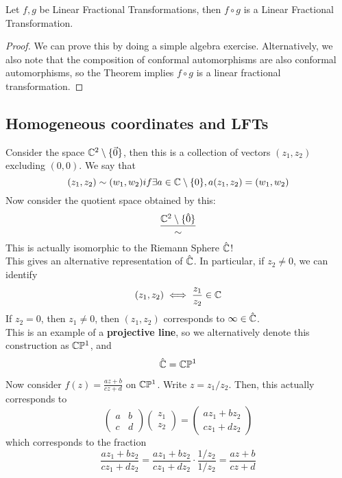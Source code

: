 \begin{proposition}
    Let $f, g$ be Linear Fractional Transformations, then $f \circ g$ is a Linear Fractional Transformation.
\end{proposition}

\begin{proof}
    We can prove this by doing a simple algebra exercise. Alternatively, we also note that the composition of conformal automorphisms are also conformal automorphisms, so the Theorem implies $f \circ g$ is a linear fractional transformation.
\end{proof}

\subsection{Homogeneous coordinates and LFTs}

Consider the space $\mathbb{C}^2 \setminus \{\Vec{0}\}$, then this is a collection of vectors $(z_1, z_2)$ excluding $(0, 0)$. We say that
\[(z_1, z_2) \sim (w_1, w_2) if \exists a \in \mathbb{C} \setminus \{0\}, a(z_1, z_2) = (w_1, w_2)\]
Now consider the quotient space obtained by this:
\[\frac{\mathbb{C}^2 \setminus \{\hat{0}\}}{\sim}\]
This is actually isomorphic to the Riemann Sphere $\hat{\mathbb{C}}$!\\

This gives an alternative representation of $\hat{\mathbb{C}}$. In particular, if $z_2 \neq 0$, we can identify
\[(z_1, z_2) \iff \frac{z_1}{z_2} \in \mathbb{C}\]
If $z_2 = 0$, then $z_1 \neq 0$, then $(z_1, z_2)$ corresponds to $\infty \in \hat{\mathbb{C}}$.\\

This is an example of a \textbf{projective line}, so we alternatively denote this construction as $\mathbb{C} \mathbb{P}^1$, and
\[\hat{\mathbb{C}} = \mathbb{C} \mathbb{P}^1\]

Now consider $f(z) = \frac{az + b}{cz + d}$ on $\mathbb{C} \mathbb{P}^1$. Write $z = z_1/z_2$. Then, this actually corresponds to
\[\begin{pmatrix}
    a & b\\
    c & d
\end{pmatrix} \begin{pmatrix}
    z_1 \\ z_2
\end{pmatrix} = \begin{pmatrix}
    a z_1 + b z_2 \\ c z_1 + d z_2
\end{pmatrix}\]
which corresponds to the fraction
\[\frac{a z_1 + b z_2}{c z_1 + d z_2} = \frac{a z_1 + b z_2}{c z_1 + d z_2} \cdot \frac{1/z_2}{1/z_2} = \frac{az + b}{cz + d}\]


